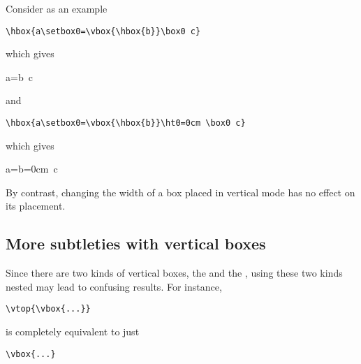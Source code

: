 \documentclass{book}
\begin{document}
Consider as an example
\begin{verbatim}
\hbox{a\setbox0=\vbox{\hbox{b}}\box0 c}
\end{verbatim}
which gives
\begin{disp}\leavevmode\hbox{a=\vbox{\hbox{b}} c}\end{disp}
and
\begin{verbatim}
\hbox{a\setbox0=\vbox{\hbox{b}}\ht0=0cm \box0 c}
\end{verbatim}
which gives
\begin{disp}\leavevmode\hbox{a=\vbox{\hbox{b}}=0cm  c}\end{disp}

By contrast, changing the width of a box placed in vertical
mode has no effect on its placement.

\subsection{More subtleties with vertical boxes}

Since there are two kinds of vertical boxes, the  and
the , using these two kinds nested may lead to
confusing results. For instance,
\begin{verbatim}
\vtop{\vbox{...}}
\end{verbatim}
is completely equivalent to just
\begin{verbatim}
\vbox{...}
\end{verbatim}
\end{document}
